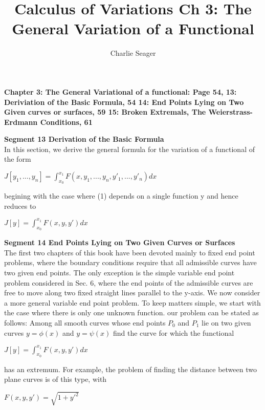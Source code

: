 \documentclass{article}
\begin{document}
\title {Calculus of Variations Ch 3: The General Variation of a Functional}

\author{Charlie Seager}

\maketitle

\textbf {Chapter 3: The General Variational of a functional: Page 54, 13: Deriviation of the Basic Formula, 54 14: End Points Lying on Two Given curves or surfaces, 59 15: Broken Extremals, The Weierstrass-Erdmann Conditions, 61}

\textbf {Segment 13 Derivation of the Basic Formula} \\ In this section, we derive the general formula for the variation of a functional of the form
\begin{center}
$J[y_1 ,..., y_n] = \int_{x_0}^{x_1} F(x, y_1 ,..., y_n, y'_1 ,..., y'_n) dx$
\end{center}
begining with the case where (1) depends on a single function y and hence reduces to 
\begin{center}
$J[y] = \int_{x_0}^{x_1} F(x, y, y') dx$
\end{center}

\textbf {Segment 14 End Points Lying on Two Given Curves or Surfaces} \\
The first two chapters of this book have been devoted mainly to fixed end point problems, where the boundary conditions require that all admissible curves have two given end points. The only exception is the simple variable end point problem considered in Sec. 6, where the end points of the admissible curves are free to move along two fixed straight lines parallel to the y-axis. We now consider a more general variable end point problem. To keep matters simple, we start with the case where there is only one unknown function. our problem can be stated as follows: Among all smooth curves whose end points $P_0$ and $P_1$ lie on two given curves $y = \phi(x)$ and $y= \psi(x)$ find the curve for which the functional
\begin{center}
$J[y] = \int_{x_0}^{x_1} F(x, y, y') dx$
\end{center}
has an extremum. For example, the problem of finding the distance between two plane curves is of this type, with
\begin{center}
$F(x,y,y') = \sqrt{1 + y'^{2}}$
\end{center}
\end{document}
